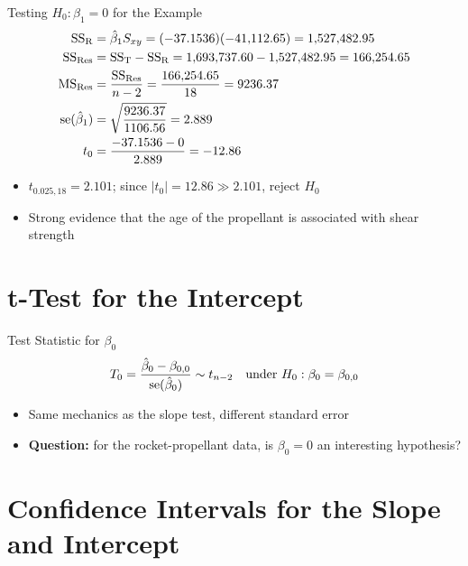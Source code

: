 \begin{frame}{Testing $H_0:\beta_1=0$ for the Example}
	\begin{align*}
		\mathrm{SS}_{\mathrm{R}} &= \hat\beta_1 S_{xy} = (-37.1536)(-41{,}112.65) = 1{,}527{,}482.95\\
		\mathrm{SS}_{\mathrm{Res}} &= \mathrm{SS}_{\mathrm{T}}-\mathrm{SS}_{\mathrm{R}} = 1{,}693{,}737.60-1{,}527{,}482.95 = 166{,}254.65\\
		\mathrm{MS}_{\mathrm{Res}} &= \frac{\mathrm{SS}_{\mathrm{Res}}}{n-2} = \frac{166{,}254.65}{18} = 9236.37\\
		\operatorname{se}(\hat\beta_1) &= \sqrt{\frac{9236.37}{1106.56}} = 2.889\\
		t_0 &= \frac{-37.1536-0}{2.889} = -12.86
	\end{align*}

	\begin{itemize}
		\item $t_{0.025,18}=2.101$; since $|t_0|=12.86 \gg 2.101$, reject $H_0$
		\item Strong evidence that the age of the propellant is associated with shear strength
	\end{itemize}
\end{frame}


\section{t-Test for the Intercept}


\begin{frame}{Test Statistic for $\beta_0$}
	\[
		T_0 = \frac{\hat\beta_0-\beta_{0,0}}{\operatorname{se}(\hat\beta_0)} \sim t_{n-2} \quad\text{under } H_0:\beta_0=\beta_{0,0}
	\]
	\begin{itemize}
		\item Same mechanics as the slope test, different standard error
		\item[] \textbf{Question:} for the rocket-propellant data, is $\beta_0=0$ an interesting hypothesis?
	\end{itemize}
\end{frame}


\section{Confidence Intervals for the Slope and Intercept}


